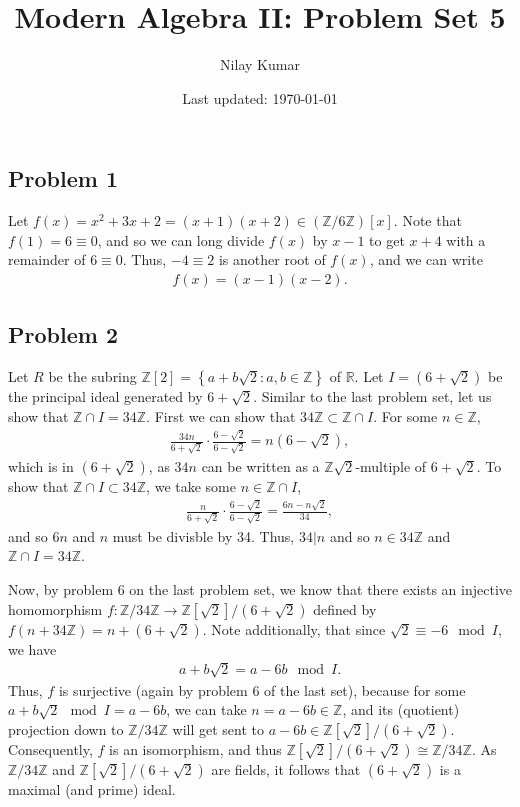 \documentclass{../../mathnotes}
\title{Modern Algebra II: Problem Set 5}
\author{Nilay Kumar}
\date{Last updated: \today}
\begin{document}
\maketitle

\subsection*{Problem 1}

Let $f(x)=x^2+3x+2=(x+1)(x+2)\in(\mathbb{Z}/6\mathbb{Z})[x]$. Note that $f(1)=6\equiv0$, and so we can long divide $f(x)$
by $x-1$ to get $x+4$ with a remainder of $6\equiv0$. Thus, $-4\equiv 2$ is another root of $f(x)$, and we can write
\begin{align*}
    f(x)=(x-1)(x-2).
\end{align*}

\subsection*{Problem 2}

Let $R$ be the subring $\mathbb{Z}[2]=\left\{ a+b\sqrt{2}:a,b\in\mathbb{Z} \right\}$ of $\mathbb{R}$. Let $I=(6+\sqrt{2})$
be the principal ideal generated by $6+\sqrt{2}$. Similar to the last problem set, let us show that $\mathbb{Z}\cap I=34\mathbb{Z}$.
First we can show that $34\mathbb{Z}\subset \mathbb{Z}\cap I$. For some $n\in\mathbb{Z}$,
\begin{align*}
    \frac{34n}{6+\sqrt{2}}\cdot\frac{6-\sqrt{2}}{6-\sqrt{2}}=n(6-\sqrt{2}),
\end{align*}
which is in $(6+\sqrt{2})$, as $34n$ can be written as a $\mathbb{Z}\sqrt{2}$-multiple of $6+\sqrt{2}$. To show that
$\mathbb{Z}\cap I\subset 34\mathbb{Z}$, we take some $n\in \mathbb{Z}\cap I$,
\begin{align*}
    \frac{n}{6+\sqrt{2}}\cdot\frac{6-\sqrt{2}}{6-\sqrt{2}}=\frac{6n-n\sqrt{2}}{34},
\end{align*}
and so $6n$ and $n$ must be divisble by 34. Thus, $34|n$ and so $n\in 34\mathbb{Z}$ and $\mathbb{Z}\cap I=34\mathbb{Z}$.

Now, by problem 6 on the last problem set, we know that there exists an injective homomorphism $f:\mathbb{Z}/34\mathbb{Z}\to\mathbb{Z}[\sqrt{2}]/(6+\sqrt{2})$
defined by $f(n+34\mathbb{Z})=n+(6+\sqrt{2})$. Note additionally, that since $\sqrt{2}\equiv -6 \mod I$, we have
\begin{align*}
    a+b\sqrt{2}=a-6b\mod I.
\end{align*}
Thus, $f$ is surjective (again by problem 6 of the last set), because for some $a+b\sqrt{2}\mod I=a-6b$, we can take $n=a-6b\in\mathbb{Z}$, and its (quotient) projection down
to $\mathbb{Z}/34\mathbb{Z}$ will get sent to $a-6b\in\mathbb{Z}[\sqrt{2}]/(6+\sqrt{2})$. Consequently, $f$ is an isomorphism, and
thus $\mathbb{Z}[\sqrt{2}]/(6+\sqrt{2})\cong \mathbb{Z}/34\mathbb{Z}.$ As $\mathbb{Z}/34\mathbb{Z}$ and $\mathbb{Z}[\sqrt{2}]/(6+\sqrt{2})$ are fields, it follows that $(6+\sqrt{2})$ is a
maximal (and prime) ideal.
\end{document}
